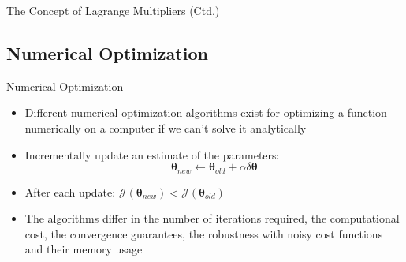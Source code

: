 \begin{frame}{The Concept of Lagrange Multipliers (Ctd.)}{}\important
\end{frame}


\subsection{Numerical Optimization}

\begin{frame}{Numerical Optimization}{}\important
	\begin{itemize}
		\item Different numerical optimization algorithms exist for optimizing a function numerically on a computer if we can't solve it analytically
		\item {} Incrementally update an estimate of the parameters:
		\begin{equation}
			\bm{\theta}_{new} \longleftarrow \bm{\theta}_{old} + \alpha \delta \bm{\theta}
		\end{equation}
		\item After each update: $\mathcal{J}(\bm{\theta}_{new}) < \mathcal{J}(\bm{\theta}_{old})$
		\item The algorithms differ in the number of iterations required, the computational cost, the convergence guarantees,
			the robustness with noisy cost functions and their memory usage
	\end{itemize}
\end{frame}


